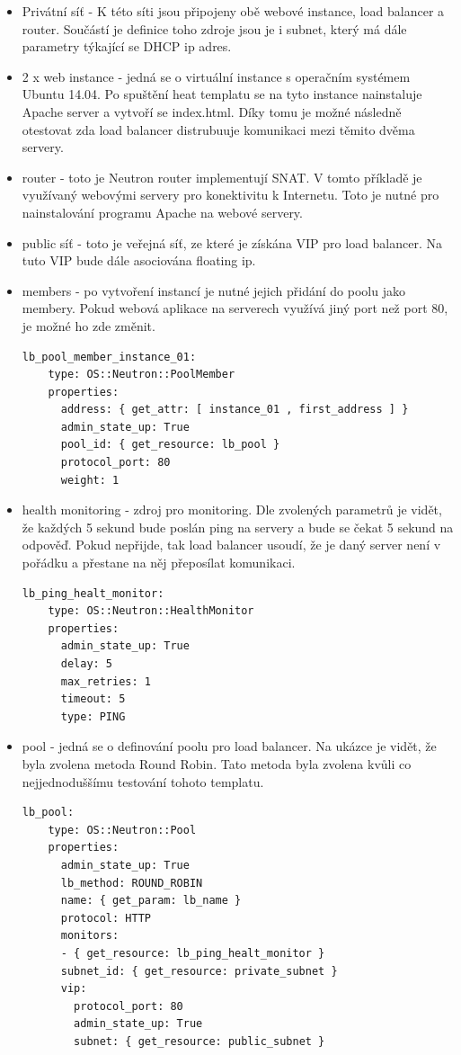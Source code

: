 \begin{itemize}
\item Privátní síť - K této síti jsou připojeny obě webové instance, load balancer a router. Součástí je definice toho zdroje jsou je i subnet, který má dále parametry týkající se DHCP ip adres.
\item 2 x web instance - jedná se o virtuální instance s operačním systémem Ubuntu 14.04. Po spuštění heat templatu se na tyto instance nainstaluje Apache server a vytvoří se index.html. Díky tomu je možné následně otestovat zda load balancer distrubuuje komunikaci mezi těmito dvěma servery.
\item router - toto je Neutron router implementují SNAT. V tomto příkladě je využívaný webovými servery pro konektivitu k Internetu. Toto je nutné pro nainstalování programu Apache na webové servery.
\item public síť - toto je veřejná síť, ze které je získána VIP pro load balancer. Na tuto VIP bude dále asociována floating ip. 
\item members - po vytvoření instancí je nutné jejich přidání do poolu jako membery. Pokud webová aplikace na serverech využívá jiný port než port 80, je možné ho zde změnit.

\begin{lstlisting}[caption=Healt monitor]
lb_pool_member_instance_01:
    type: OS::Neutron::PoolMember
    properties:
      address: { get_attr: [ instance_01 , first_address ] }
      admin_state_up: True
      pool_id: { get_resource: lb_pool }
      protocol_port: 80
      weight: 1
\end{lstlisting}

\item health monitoring - zdroj pro monitoring. Dle zvolených parametrů je vidět, že každých 5 sekund bude poslán ping na servery a bude se čekat 5 sekund na odpověď. Pokud nepřijde, tak load balancer usoudí, že je daný server není v pořádku a přestane na něj přeposílat komunikaci.

\begin{lstlisting}[caption=Healt monitor]
lb_ping_healt_monitor:
    type: OS::Neutron::HealthMonitor
    properties:
      admin_state_up: True
      delay: 5
      max_retries: 1
      timeout: 5
      type: PING
\end{lstlisting}

\item pool - jedná se o definování poolu pro load balancer. Na ukázce je vidět, že byla zvolena metoda Round Robin. Tato metoda byla zvolena kvůli co nejjednoduššímu testování tohoto templatu.

\begin{lstlisting}[caption=Healt monitor]
lb_pool:
    type: OS::Neutron::Pool
    properties:
      admin_state_up: True
      lb_method: ROUND_ROBIN
      name: { get_param: lb_name }
      protocol: HTTP
      monitors:
      - { get_resource: lb_ping_healt_monitor }
      subnet_id: { get_resource: private_subnet }
      vip:
        protocol_port: 80
        admin_state_up: True
        subnet: { get_resource: public_subnet }
\end{lstlisting}
\end{itemize}

